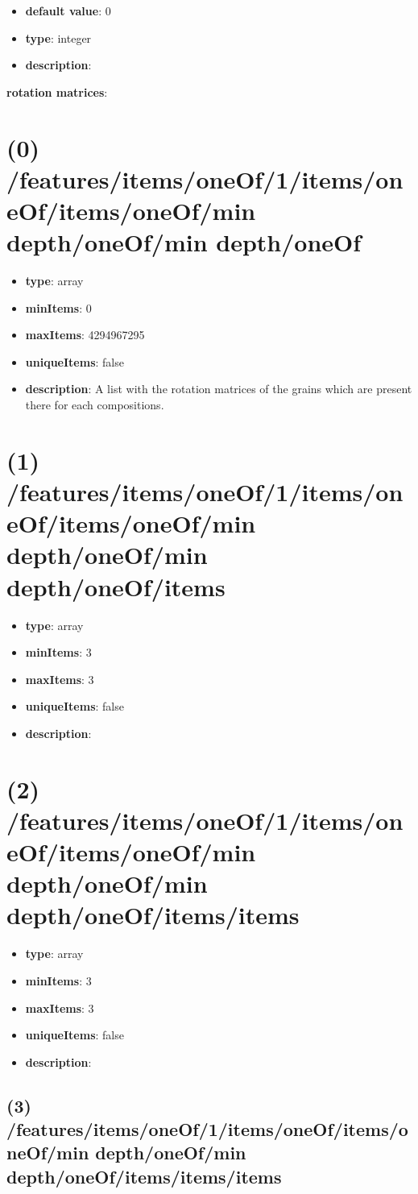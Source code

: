 \begin{itemize}[leftmargin=1em]\item {\bf default value}: 0
\item {\bf type}: integer
\item {\bf description}: 
\end{itemize}\item {\bf rotation matrices}: \section{(0) /features/items/oneOf/1/items/oneOf/items/oneOf/min depth/oneOf/min depth/oneOf}
\begin{itemize}[leftmargin=0em]\item {\bf type}: array
\item {\bf minItems}: 0
\item {\bf maxItems}: 4294967295
\item {\bf uniqueItems}: false
\item {\bf description}: A list with the rotation matrices of the grains which are present there for each compositions.
\end{itemize}\section{(1) /features/items/oneOf/1/items/oneOf/items/oneOf/min depth/oneOf/min depth/oneOf/items}
\begin{itemize}[leftmargin=1em]\item {\bf type}: array
\item {\bf minItems}: 3
\item {\bf maxItems}: 3
\item {\bf uniqueItems}: false
\item {\bf description}: 
\end{itemize}\section{(2) /features/items/oneOf/1/items/oneOf/items/oneOf/min depth/oneOf/min depth/oneOf/items/items}
\begin{itemize}[leftmargin=2em]\item {\bf type}: array
\item {\bf minItems}: 3
\item {\bf maxItems}: 3
\item {\bf uniqueItems}: false
\item {\bf description}: 
\end{itemize}\subsection{(3) /features/items/oneOf/1/items/oneOf/items/oneOf/min depth/oneOf/min depth/oneOf/items/items/items}
